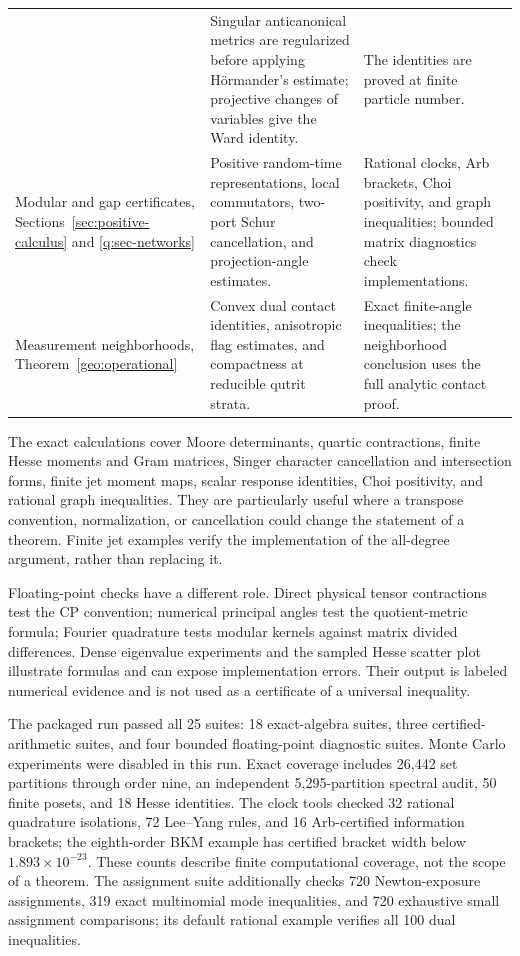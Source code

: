 \begin{longtable}{p{.22\linewidth}p{.42\linewidth}p{.26\linewidth}}
& Singular anticanonical metrics are regularized before applying
H\"ormander's estimate; projective changes of variables give the Ward identity.
& The identities are proved at finite particle number.\\[5pt]
Modular and gap certificates,
Sections~\ref{sec:positive-calculus} and \ref{q:sec-networks}
& Positive random-time representations, local commutators, two-port
Schur cancellation, and projection-angle estimates.
& Rational clocks, Arb brackets, Choi positivity, and graph inequalities;
bounded matrix diagnostics check implementations.\\[5pt]
Measurement neighborhoods, Theorem~\ref{geo:operational}
& Convex dual contact identities, anisotropic flag estimates, and
compactness at reducible qutrit strata.
& Exact finite-angle inequalities; the neighborhood conclusion uses
the full analytic contact proof.\\
\bottomrule
\end{longtable}
\endgroup

The exact calculations cover Moore determinants, quartic contractions,
finite Hesse moments and Gram matrices, Singer character cancellation and
intersection forms, finite jet moment maps, scalar response identities,
Choi positivity, and rational graph inequalities. They are particularly
useful where a transpose convention, normalization, or cancellation could
change the statement of a theorem. Finite jet examples verify the
implementation of the all-degree argument, rather than replacing it.

Floating-point checks have a different role. Direct physical tensor
contractions test the CP convention; numerical principal angles test the
quotient-metric formula; Fourier quadrature tests modular kernels against
matrix divided differences. Dense eigenvalue experiments and the sampled
Hesse scatter plot illustrate formulas and can expose implementation
errors. Their output is labeled numerical evidence and is not used as a
certificate of a universal inequality.

The packaged run passed all 25 suites: 18 exact-algebra suites, three
certified-arithmetic suites, and four bounded floating-point diagnostic
suites. Monte Carlo experiments were disabled in this run. Exact coverage
includes 26,442 set partitions through order nine, an independent
5,295-partition spectral audit, 50 finite posets, and 18 Hesse identities.
The clock tools checked 32 rational quadrature isolations, 72 Lee--Yang
rules, and 16 Arb-certified information brackets; the eighth-order BKM
example has certified bracket width below $1.893\times10^{-23}$. These
counts describe finite computational coverage, not the scope of a theorem.
The assignment suite additionally checks 720 Newton-exposure assignments,
319 exact multinomial mode inequalities, and 720 exhaustive small
assignment comparisons; its default rational example verifies all 100
dual inequalities.

